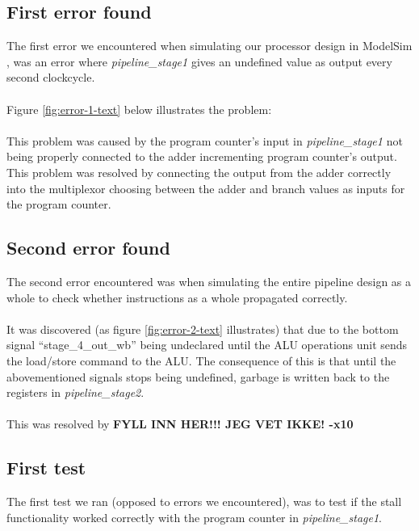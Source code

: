\subsection{First error found}
The first error we encountered when simulating our processor design in ModelSim
\cite{modelsim}, was an error where \emph{pipeline\_stage1} gives an undefined
value as output every second clockcycle.
\paragraph*{}
Figure \ref{fig:error-1-text} below illustrates the problem:

\paragraph*{}
This problem was caused by the program counter's input in
\emph{pipeline\_stage1} not being properly connected to the adder incrementing
program counter's output. This problem was resolved by connecting the output
from the adder correctly into the multiplexor choosing between the adder and
branch values as inputs for the program counter.

\subsection{Second error found}
The second error encountered was when simulating the entire pipeline design as
a whole to check whether instructions as a whole propagated correctly.
\paragraph*{}
It was discovered (as figure \ref{fig:error-2-text} illustrates) that due to the
bottom signal ``stage\_4\_out\_wb'' being undeclared until the ALU operations unit
sends the load/store command to the ALU. The consequence of this is that until
the abovementioned signals stops being undefined, garbage is written back to the
registers in \emph{pipeline\_stage2}.

\paragraph*{}
This was resolved by\newline
\textbf{FYLL INN HER!!! JEG VET IKKE! -x10}

\subsection{First test}

The first test we ran (opposed to errors we encountered), was to test if the
stall functionality worked correctly with the program counter in
\emph{pipeline\_stage1}.
